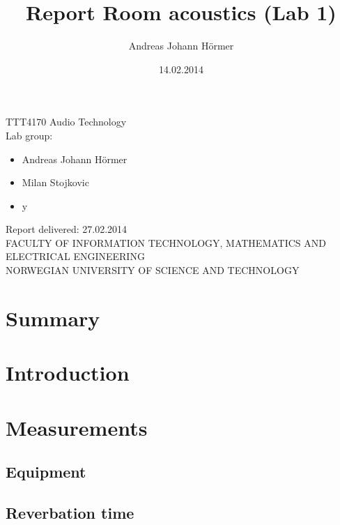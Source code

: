 \documentclass{article}
\title{Report Room acoustics (Lab 1)}
\author{Andreas Johann H\"ormer}
\date{14.02.2014}
\begin{document}
\maketitle
\begin{center}
TTT4170 Audio Technology\\[3cm]
Lab group:
\begin{itemize}
\item Andreas Johann H\"ormer
\item Milan Stojkovic
\item y\\[3cm]
\end{itemize}
Report delivered: 27.02.2014\\[6cm]
FACULTY OF INFORMATION TECHNOLOGY, MATHEMATICS AND ELECTRICAL ENGINEERING\\
NORWEGIAN UNIVERSITY OF SCIENCE AND TECHNOLOGY
\end{center}

\tableofcontents

\newpage
\section{Summary}

\newpage
\section{Introduction}


\newpage
\section{Measurements}
\subsection{Equipment}
\subsection{Reverbation time}
\end{document}
